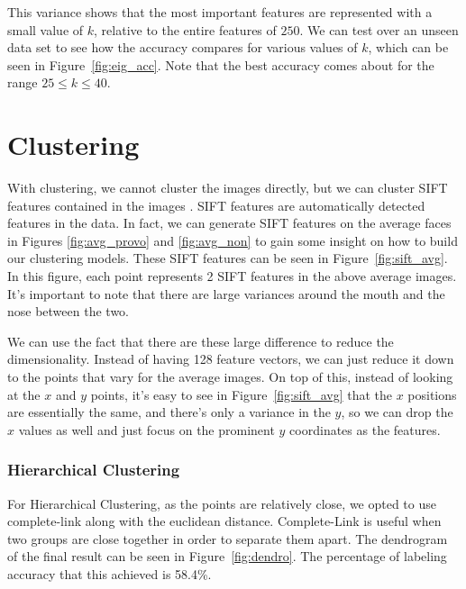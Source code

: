 \documentclass{article}
\begin{document}
This variance shows that the most important features are represented with a small value of $k$, relative to the entire features of $250$. We can test over an unseen data set to see how the accuracy compares for various values of $k$, which can be seen in Figure~\ref{fig:eig_acc}. Note that the best accuracy comes about for the range $25 \leq k \leq 40$.

\section*{Clustering}

With clustering, we cannot cluster the images directly, but we can cluster SIFT features contained in the images \cite{SIFT}. SIFT features are automatically detected features in the data. In fact, we can generate SIFT features on the average faces in Figures \ref{fig:avg_provo} and \ref{fig:avg_non} to gain some insight on how to build our clustering models. These SIFT features can be seen in Figure~\ref{fig:sift_avg}. In this figure, each point represents 2 SIFT features in the above average images. It's important to note that there are large variances around the mouth and the nose between the two.

We can use the fact that there are these large difference to reduce the dimensionality. Instead of having 128 feature vectors, we can just reduce it down to the points that vary for the average images. On top of this, instead of looking at the $x$ and $y$ points, it's easy to see in Figure~\ref{fig:sift_avg} that the $x$ positions are essentially the same, and there's only a variance in the $y$, so we can drop the $x$ values as well and just focus on the prominent $y$ coordinates as the features.

\subsubsection*{Hierarchical Clustering}

For Hierarchical Clustering, as the points are relatively close, we opted to use complete-link along with the euclidean distance. Complete-Link is useful when two groups are close together in order to separate them apart. The dendrogram of the final result can be seen in Figure~\ref{fig:dendro}. The percentage of labeling accuracy that this achieved is 58.4\%. 
\end{document}
